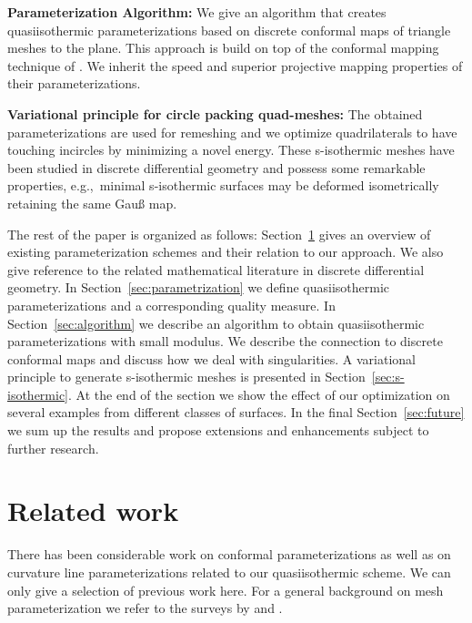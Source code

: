 \documentclass[Thesis.tex]{subfiles}
\begin{document}
\noindent\textbf{Parameterization Algorithm:}
We give an algorithm that creates quasiisothermic parameterizations based on discrete
conformal maps of triangle meshes to the plane. This approach is build on top 
of the conformal mapping technique of \cite{Springborn2008}. We
inherit the speed and superior projective mapping properties of their 
parameterizations.

\noindent\textbf{Variational principle for circle packing quad-meshes:}
The obtained parameterizations are used for remeshing and we optimize 
quadrilaterals to have touching incircles by minimizing a novel energy. These
s-isothermic meshes have been studied in discrete differential geometry and
possess some remarkable properties, e.g.,\ minimal s-isothermic surfaces may be
deformed isometrically retaining the same Gau{\ss} map.

The rest of the paper is organized as follows: Section~\ref{sec:previouswork}
gives an overview of existing parameterization schemes and their relation to
our approach. We also give reference to the related mathematical literature in
discrete differential geometry. In Section~\ref{sec:parametrization} we define
quasiisothermic parameterizations and a corresponding quality measure. 
In Section~\ref{sec:algorithm} we describe an algorithm to
obtain quasiisothermic parameterizations with small modulus. We describe the 
connection to discrete conformal maps and discuss how we deal with singularities. %
A variational principle to generate s-isothermic meshes is presented in
Section~\ref{sec:s-isothermic}. At the end of the section we show the effect of
our optimization on several examples from different classes of surfaces. In the
final Section~\ref{sec:future} we sum up the results and propose extensions and
enhancements subject to further research.


\section{Related work}
\label{sec:previouswork}

There has been considerable work on conformal parameterizations as well as on
curvature line parameterizations related to our quasiisothermic scheme. We can 
only give a selection of previous work here.
For a general background on mesh parameterization we refer to the surveys by
\cite{Floater2005} and \cite{ShefferPR2006}.
\end{document}
